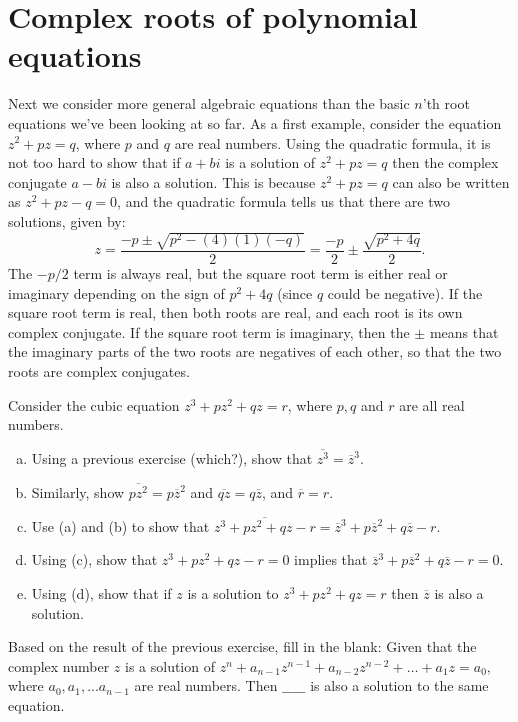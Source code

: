 {\section{Complex roots of polynomial equations}\label{sec:FTOA}

Next we consider more general algebraic equations than the basic $n$'th root equations we've been looking at so far. As a first example, consider the equation $z^2 + pz = q$, where $p$ and  $q$ are real numbers. Using  the quadratic formula, it is not too hard to show that if $a + bi$ is a solution of $z^2 + pz = q$ then the complex conjugate $a - bi$ is also a solution. This is because  $z^2 + pz = q$ can also be written as  $z^2 + pz - q = 0$, and the quadratic formula tells us that there are two solutions, given by:
$$ z = \frac{-p \pm \sqrt{p^2 - (4)(1)(-q)}}{2} = \frac{-p}{2}  \pm \frac{\sqrt{p^2 + 4q}}{2}.$$
The $-p/2$ term is always real, but the square root term is either real or imaginary depending on the sign of $p^2 + 4q$  (since $q$ could be negative).  If the square root term is real, then both roots are real, and each root is its own complex conjugate.  If the square root term is imaginary, then the $\pm$ means that the imaginary parts of the two roots are negatives of each other, so that the two roots are complex conjugates.

\begin{exercise}\label{exercise:complex:cubic_conj}
Consider the cubic equation $z^3 + pz^2 + qz = r$, where $p, q$ and  $r$ are all real numbers.
\begin{enumerate}[(a)]
\item
Using a previous exercise (which?), show that $\overline{z^3} = \overline{z}^3$.
\item
Similarly, show  $\overline{pz^2} = p\overline{z}^2$ and $\overline{qz} = q\overline{z}$, and $\overline{r} = r$.
\item 
Use (a) and (b) to show that $\overline{z^3 + pz^2 + qz - r} = \overline{z}^3 + p\overline{z}^2 + q\overline{z} - r$.
\item
Using (c), show that $z^3 + pz^2 + qz - r = 0$ implies that $\overline{z}^3 + p\overline{z}^2 + q\overline{z} - r = 0$.
\item
Using (d), show that if $z$ is a solution to $z^3 + pz^2 + qz = r$ then $\overline{z}$ is also a solution.
\end{enumerate}
\end{exercise}

\begin{exercise}\label{exercise:complex:conjugate_root}
Based on the result of the previous exercise, fill in the blank: Given that the complex number $z$ is a solution of $z^n + a_{n-1}z^{n-1} + a_{n-2} z^{n-2} + \ldots + a_1 z =a_0,$ where $a_0, a_1, ... a_{n-1}$ are real numbers. Then $\_\_\_\_\_$ is also a solution to the same equation.
\end{exercise}

}
